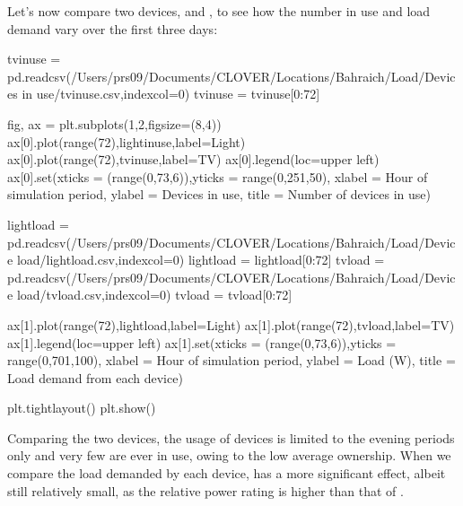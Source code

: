 \documentclass[letterpaper,10pt,english]{sphinxmanual}
\begin{document}
\sphinxAtStartPar
Let’s now compare two devices,  and , to see how the
number in use and load demand vary over the first three days:

\begin{sphinxVerbatim}[commandchars=\\\{\}]
tv\PYGZus{}in\PYGZus{}use = pd.read\PYGZus{}csv(\PYGZdq{}/Users/prs09/Documents/CLOVER/Locations/Bahraich/Load/Devices in use/tv\PYGZus{}in\PYGZus{}use.csv\PYGZdq{},index\PYGZus{}col=0)
tv\PYGZus{}in\PYGZus{}use = tv\PYGZus{}in\PYGZus{}use[0:72]

fig, ax = plt.subplots(1,2,figsize=(8,4))
ax[0].plot(range(72),light\PYGZus{}in\PYGZus{}use,label=\PYGZsq{}Light\PYGZsq{})
ax[0].plot(range(72),tv\PYGZus{}in\PYGZus{}use,label=\PYGZsq{}TV\PYGZsq{})
ax[0].legend(loc=\PYGZsq{}upper left\PYGZsq{})
ax[0].set(xticks = (range(0,73,6)),yticks = range(0,251,50),
          xlabel = \PYGZsq{}Hour of simulation period\PYGZsq{},
          ylabel = \PYGZsq{}Devices in use\PYGZsq{},
          title = \PYGZsq{}Number of devices in use\PYGZsq{})

light\PYGZus{}load = pd.read\PYGZus{}csv(\PYGZdq{}/Users/prs09/Documents/CLOVER/Locations/Bahraich/Load/Device load/light\PYGZus{}load.csv\PYGZdq{},index\PYGZus{}col=0)
light\PYGZus{}load = light\PYGZus{}load[0:72]
tv\PYGZus{}load = pd.read\PYGZus{}csv(\PYGZdq{}/Users/prs09/Documents/CLOVER/Locations/Bahraich/Load/Device load/tv\PYGZus{}load.csv\PYGZdq{},index\PYGZus{}col=0)
tv\PYGZus{}load = tv\PYGZus{}load[0:72]

ax[1].plot(range(72),light\PYGZus{}load,label=\PYGZsq{}Light\PYGZsq{})
ax[1].plot(range(72),tv\PYGZus{}load,label=\PYGZsq{}TV\PYGZsq{})
ax[1].legend(loc=\PYGZsq{}upper left\PYGZsq{})
ax[1].set(xticks = (range(0,73,6)),yticks = range(0,701,100),
          xlabel = \PYGZsq{}Hour of simulation period\PYGZsq{},
          ylabel = \PYGZsq{}Load (W)\PYGZsq{},
          title = \PYGZsq{}Load demand from each device\PYGZsq{})

plt.tight\PYGZus{}layout()
plt.show()
\end{sphinxVerbatim}

\noindent{}

\sphinxAtStartPar
Comparing the two devices, the usage of  devices is limited to the
evening periods only and very few are ever in use, owing to the low
average ownership. When we compare the load demanded by each device,
 has a more significant effect, albeit still relatively small, as
the relative power rating is higher than that of .
\end{document}
